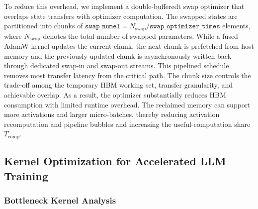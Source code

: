 To reduce this overhead, we implement a double-bufferedt swap optimizer that overlaps state transfers with optimizer computation. The swapped states are partitioned into chunks of
$\texttt{swap\_numel}
= N_{\mathrm{swap}}/\texttt{swap\_optimizer\_times}$ elements, where
$N_{\mathrm{swap}}$ denotes the total number of swapped parameters. While a fused AdamW kernel updates the current chunk, the next chunk is prefetched from host memory and the previously updated chunk is asynchronously written back through dedicated swap-in and swap-out streams. This pipelined schedule removes most transfer latency from the critical path. The chunk size controls the trade-off among the temporary HBM working set, transfer granularity, and achievable overlap. As a result, the optimizer substantially reduces HBM consumption with limited runtime overhead. The reclaimed memory can support more activations and larger micro-batches, thereby reducing activation recomputation and pipeline bubbles and increasing the useful-computation share $T_{\mathrm{comp}}$.

\subsection{Kernel Optimization for Accelerated LLM Training}
\label{sec:kernel_opt}

\subsubsection{Bottleneck Kernel Analysis}
\label{sec:kernel_bottleneck}





